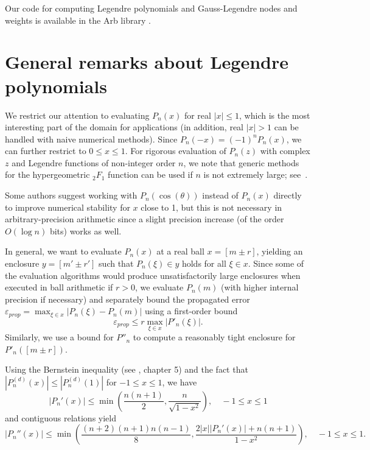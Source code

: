 \documentclass[11pt,a4paper]{article}
\begin{document}
Our code for computing Legendre polynomials and
Gauss-Legendre nodes and weights is available
in the Arb library \cite{Johansson2017arb}.

\section{General remarks about Legendre polynomials}

We restrict our attention to
evaluating $P_n(x)$ for real $|x| \le 1$,
which is the most interesting part of the domain for applications
(in addition, real $|x| > 1$ can be handled with naive numerical methods).
Since $P_n(-x) = (-1)^n P_n(x)$, we can further
restrict to $0 \le x \le 1$.
For rigorous evaluation of $P_n(z)$ with complex $z$
and Legendre functions of non-integer order $n$,
we note that generic methods for the hypergeometric ${}_2F_1$ function
can be used if $n$ is not extremely large; see~\cite{johansson2016hypergeometric}.

Some authors suggest working with $P_n(\cos(\theta))$ instead of $P_n(x)$
directly to improve numerical stability for $x$ close to 1, but
this is not necessary in arbitrary-precision arithmetic since
a slight precision increase (of the order $O(\log n)$ bits)
works as well.

In general, we want to evaluate $P_n(x)$ at a real ball $x = [m \pm r]$,
yielding an enclosure $y = [m' \pm r']$ such that $P_n(\xi) \in y$ holds for all
$\xi \in x$. Since some of the evaluation algorithms would produce
unsatisfactorily large enclosures when executed in ball arithmetic if $r > 0$,
we evaluate $P_n(m)$ (with higher internal precision if necessary) and separately
bound the propagated error $\varepsilon_{prop} = \max_{\xi \in x} |P_n(\xi) - P_n(m)|$
using a first-order bound
$$\varepsilon_{prop} \le r \max_{\xi \in x} |P'_n(\xi)|.$$
Similarly, we use a bound for $P''_n$ to compute a reasonably
tight enclosure for $P'_n([m \pm r])$.


Using the Bernstein inequality (see \cite{borwein2012polynomials}, chapter 5)
and the fact that $|P^{(d)}_n(x)| \le |P^{(d)}_n(1)|$ for $-1 \le x \le 1$,
we have
$$|P_n'(x)| \le \min\left(\frac{n(n+1)}{2}, \frac{n}{\sqrt{1-x^2}}\right), \quad -1 \le x \le 1$$
and contiguous relations yield
$$|P_n''(x)| \le \min\left(\frac{(n+2)(n+1)n(n-1)}{8}, \frac{2|x||P_n'(x)| + n(n+1)}{1-x^2}\right), \quad -1 \le x \le 1.$$
\end{document}
